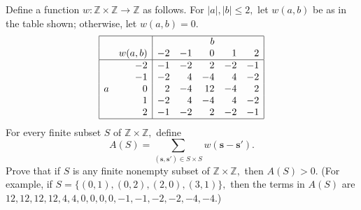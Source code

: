 Define a function $w:\mathbb{Z}\times\mathbb{Z}\to\mathbb{Z}$ as follows. For $|a|,|b|\le 2,$ let $w(a,b)$ be as in the table shown; otherwise, let $w(a,b)=0.$
\[\begin{array}{|lr|rrrrr|}\hline &&&&b&&\\
&w(a,b)&-2&-1&0&1&2\\ \hline
&-2&-1&-2&2&-2&-1\\
&-1&-2&4&-4&4&-2\\
a&0&2&-4&12&-4&2\\
&1&-2&4&-4&4&-2\\
&2&-1&-2&2&-2&-1\\ \hline\end{array}\]
For every finite subset $S$ of $\mathbb{Z}\times\mathbb{Z},$ define \[A(S)=\sum_{(\mathbf{s},\mathbf{s'})\in S\times S} w(\mathbf{s}-\mathbf{s'}).\] Prove that if $S$ is any finite nonempty subset of $\mathbb{Z}\times\mathbb{Z},$ then $A(S)>0.$ (For example, if $S=\{(0,1),(0,2),(2,0),(3,1)\},$ then the terms in $A(S)$ are $12,12,12,12,4,4,0,0,0,0,-1,-1,-2,-2,-4,-4.$)